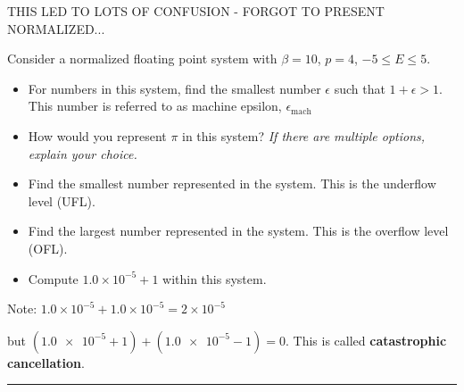 \documentclass[12pt,letterpaper,noanswers]{exam}
\begin{document}
THIS LED TO LOTS OF CONFUSION - FORGOT TO PRESENT NORMALIZED...

Consider a normalized floating point system with $\beta = 10$, $p = 4$, $-5\leq E \leq 5$.
\begin{itemize}
    \item For numbers in this system, find the smallest number $\epsilon$ such that $1+\epsilon > 1$.  This number is referred to as machine epsilon, $\epsilon_{\text{mach}}$
    \vspace{0.7in}
    
    \item How would you represent $\pi$ in this system?  \emph{If there are multiple options, explain your choice.}
    \vspace{1in}
\end{itemize}


\begin{itemize}
\item Find the smallest number represented in the system.  This is the underflow level (UFL).
\vspace{0.5in}

\item Find the largest number represented in the system.  This is the overflow level (OFL).
\vspace{0.5in}

\item Compute $1.0\times 10^{-5}+ 1$ within this system.
\vspace{0.5in}
\end{itemize}

Note: $1.0\times 10^{-5} + 1.0\times 10^{-5} = 2\times 10^{-5}$ 

but $(\num{1.0e-5} + 1) + (\num{1.0e-5}-1) = 0$.  This is called \textbf{catastrophic cancellation}.

\vspace{0.2cm}
\hrule
\vspace{0.2cm}
\end{document}
